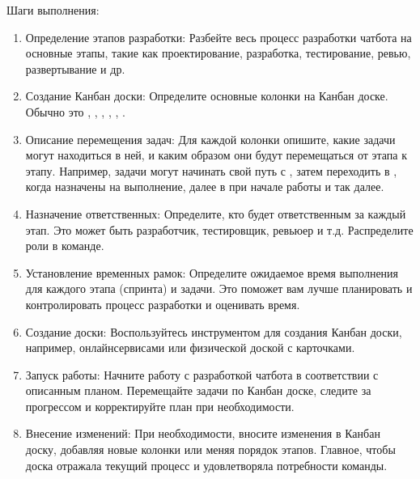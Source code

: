 \documentclass[letterpaper,10pt,russian]{sphinxmanual}
\begin{document}
\sphinxAtStartPar
Шаги выполнения:
\begin{enumerate}
%
\item {} 
\sphinxAtStartPar
Определение этапов разработки: Разбейте весь процесс разработки чат\sphinxhyphen{}бота на основные этапы, такие как проектирование, разработка, тестирование, ревью, развертывание и др.

\item {} 
\sphinxAtStartPar
Создание Канбан доски: Определите основные колонки на Канбан доске. Обычно это , , , , , .

\item {} 
\sphinxAtStartPar
Описание перемещения задач: Для каждой колонки опишите, какие задачи могут находиться в ней, и каким образом они будут перемещаться от этапа к этапу. Например, задачи могут начинать свой путь с , затем переходить в , когда назначены на выполнение, далее в  при начале работы и так далее.

\item {} 
\sphinxAtStartPar
Назначение ответственных: Определите, кто будет ответственным за каждый этап. Это может быть разработчик, тестировщик, ревьюер и т.д. Распределите роли в команде.

\item {} 
\sphinxAtStartPar
Установление временных рамок: Определите ожидаемое время выполнения для каждого этапа (спринта) и задачи. Это поможет вам лучше планировать и контролировать процесс разработки и оценивать время.

\item {} 
\sphinxAtStartPar
Создание доски: Воспользуйтесь инструментом для создания Канбан доски, например, онлайн\sphinxhyphen{}сервисами или физической доской с карточками.

\item {} 
\sphinxAtStartPar
Запуск работы: Начните работу с разработкой чат\sphinxhyphen{}бота в соответствии с описанным планом. Перемещайте задачи по Канбан доске, следите за прогрессом и корректируйте план при необходимости.

\item {} 
\sphinxAtStartPar
Внесение изменений: При необходимости, вносите изменения в Канбан доску, добавляя новые колонки или меняя порядок этапов. Главное, чтобы доска отражала текущий процесс и удовлетворяла потребности команды.

\end{enumerate}
\end{document}
